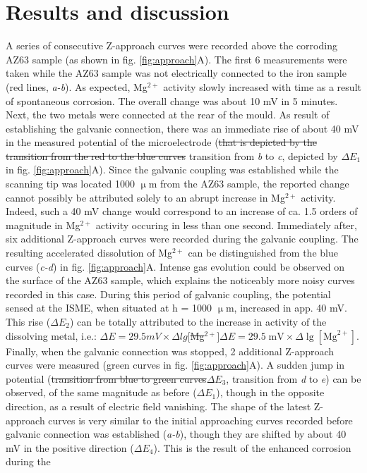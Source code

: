\documentclass[3p]{elsarticle}
\providecommand{\DIFadd}[1]{{\protect\color{blue}#1}} %
\providecommand{\DIFdel}[1]{{\protect\color{red}\sout{#1}}}                      %
\providecommand{\DIFaddbegin}{} %
\providecommand{\DIFaddend}{} %
\providecommand{\DIFdelbegin}{} %
\providecommand{\DIFdelend}{} %
\begin{document}
\section{Results and discussion}

A series of consecutive Z-approach curves were recorded above the corroding AZ63 sample (as shown in fig. \ref{fig:approach}A). The first 6 measurements were taken while the AZ63 sample was not electrically connected to the iron sample (red lines\DIFaddbegin \DIFadd{, }\emph{\DIFadd{a-b}}\DIFaddend ). As expected, Mg$^{2+}$ activity slowly increased with time as a result of spontaneous corrosion. The overall change was about 10 mV in 5 minutes. Next, the two metals were connected at the rear of the mould. As result of establishing the galvanic connection, there was an immediate rise of about 40 mV in the measured potential of the microelectrode (\DIFdelbegin \DIFdel{that is depicted by the transition from the red to the blue curves }\DIFdelend \DIFaddbegin \DIFadd{transition from }\emph{\DIFadd{b}} \DIFadd{to }\emph{\DIFadd{c}}\DIFadd{, depicted by $\Delta E_1$ }\DIFaddend in fig. \ref{fig:approach}A). Since the galvanic coupling was established while the scanning tip was located 1000 $\upmu$m from the AZ63 sample, the reported change cannot possibly be attributed solely to an abrupt increase in Mg$^{2+}$ activity. Indeed, such a 40 mV change would correspond to an increase of ca. 1.5 orders of magnitude in Mg$^{2+}$ activity occuring in less than one second. Immediately after, six additional Z-approach curves were recorded during the galvanic coupling. The resulting accelerated dissolution of Mg$^{2+}$ can be distinguished from the blue curves \DIFaddbegin \DIFadd{(}\emph{\DIFadd{c-d}}\DIFadd{) }\DIFaddend in fig. \ref{fig:approach}A. Intense gas evolution could be observed on the surface of the AZ63 sample, which explains the noticeably more noisy curves recorded in this case. During this period of galvanic coupling, the potential sensed at the ISME, when situated at h = 1000 $\upmu$m, increased in app. 40 mV. This rise \DIFaddbegin \DIFadd{($\Delta E_2$) }\DIFaddend can be totally attributed to the increase in activity of the dissolving metal, i.e.: \DIFdelbegin \DIFdel{$\Delta E = 29.5 mV \times \Delta lg[$Mg$^{2+}]$}\DIFdelend \DIFaddbegin \DIFadd{$\Delta E = 29.5 \; \textrm{mV} \times \Delta \lg[\textrm{Mg}^{2+}]$}\DIFaddend . Finally, when the galvanic connection was stopped, 2 additional Z-approach curves were measured (green curves in fig. \ref{fig:approach}A). A sudden jump in potential (\DIFdelbegin \DIFdel{transition from blue to green curves}\DIFdelend \DIFaddbegin \DIFadd{$\Delta E_3$, transition from }\emph{\DIFadd{d}} \DIFadd{to }\emph{\DIFadd{e}}\DIFaddend ) can be observed, of the same magnitude as before \DIFaddbegin \DIFadd{($\Delta E_1$)}\DIFaddend , though in the opposite direction, as a result of electric field vanishing. The shape of the latest Z-approach curves is very similar to the initial approaching curves recorded before galvanic connection was established \DIFaddbegin \DIFadd{(}\emph{\DIFadd{a-b}}\DIFadd{)}\DIFaddend , though they are shifted by about 40 mV in the positive direction \DIFaddbegin \DIFadd{($\Delta E_4$)}\DIFaddend . This is the result of the enhanced corrosion during the 
\end{document}

